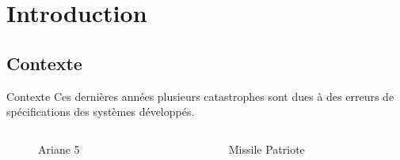 \section{Introduction}

\subsection{Contexte}
\begin{frame}{Contexte}
Ces dernières années plusieurs catastrophes sont dues à des erreurs de spécifications des systèmes développés.
\begin{columns}
	\begin{column}{0.3\textwidth}
		\begin{figure}
			{  
				\caption{Ariane 5}
			}
		\end{figure}
	\end{column}

	\begin{column}{0.3\textwidth}
	\begin{figure}
		{  
			\caption{Missile Patriote}
		}
	\end{figure}
\end{column}


\end{columns}
\end{frame}
